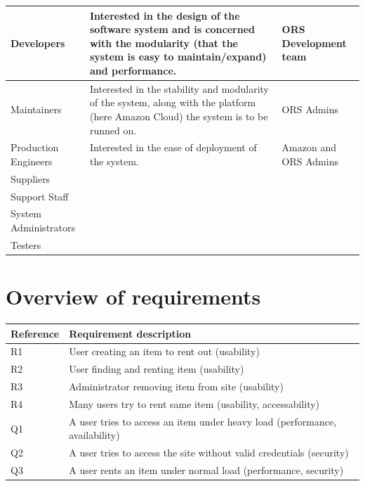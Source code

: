 \documentclass[a4paper,11pt]{report}
\begin{document}
\begin{table}
\begin{center}
\begin{tabular}[h]{| l |  p{6cm} | l |}
    \hline
    Developers & Interested in the design of the software system and is concerned with the modularity (that the system is easy to maintain/expand) and performance. & ORS Development team\\
    \hline
    Maintainers & Interested in the stability and modularity of the system, along with the platform (here Amazon Cloud) the system is to be runned on. & ORS Admins \\
    \hline
    Production Engineers & Interested in the ease of deployment of the system. & Amazon and ORS Admins\\
    \hline
    Suppliers & & \\
    \hline
    Support Staff & & \\
    \hline
    System Administrators & & \\
    \hline
    Testers & & \\
    \hline
  \end{tabular}
\end{center}
\end{table}

\section{Overview of requirements}\label{sec:overv-requ}
\begin{table}
\begin{center}
  \begin{tabular}[h]{| l |  l |}
    \hline
    \textbf{Reference} & \textbf{Requirement description} \\
    \hline
    R1 & User creating an item to rent out (usability)\\
    \hline
    R2 & User finding and renting item (usability)\\
    \hline
    R3 & Administrator removing item from site (usability)\\
    \hline
    R4 & Many users try to rent same item (usability, accessability)\\
    \hline
    Q1 & A user tries to access an item under heavy load (performance, availability)\\
    \hline
    Q2 & A user tries to access the site without valid credentials (security)\\
    \hline
    Q3 & A user rents an item under normal load (performance, security)\\
    \hline
  \end{tabular}
\end{center}
\end{table}
\end{document}
